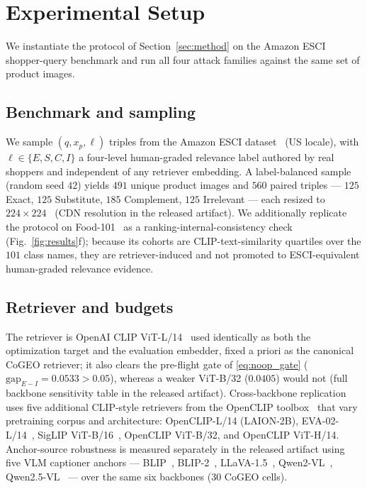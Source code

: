 \section{Experimental Setup}
\label{sec:setup}

We instantiate the protocol of Section~\ref{sec:method} on the Amazon ESCI shopper-query benchmark and run all four attack families against the same set of product images.

\subsection{Benchmark and sampling}
\label{sec:setup:bench}

We sample $(q, x_p, \ell)$ triples from the Amazon ESCI dataset~\cite{reddy2022esci} (US locale), with $\ell \in \{E, S, C, I\}$ a four-level human-graded relevance label authored by real shoppers and independent of any retriever embedding. A label-balanced sample (random seed $42$) yields $491$ unique product images and $560$ paired triples --- $125$ Exact, $125$ Substitute, $185$ Complement, $125$ Irrelevant --- each resized to $224 \times 224$~\cite{radford2021clip} (CDN resolution in the released artifact). We additionally replicate the protocol on Food-101~\cite{bossard2014food101} as a ranking-internal-consistency check (Fig.~\ref{fig:results}f); because its cohorts are CLIP-text-similarity quartiles over the $101$ class names, they are retriever-induced and not promoted to ESCI-equivalent human-graded relevance evidence.

\subsection{Retriever and budgets}
\label{sec:setup:budget}

The retriever is OpenAI CLIP ViT-L/14~\cite{radford2021clip} used identically as both the optimization target and the evaluation embedder, fixed a priori as the canonical CoGEO retriever; it also clears the pre-flight gate of \eqref{eq:noop_gate} ($\mathrm{gap}_{E-I} = 0.0533 > 0.05$), whereas a weaker ViT-B/32 ($0.0405$) would not (full backbone sensitivity table in the released artifact). Cross-backbone replication uses five additional CLIP-style retrievers from the OpenCLIP toolbox~\cite{cherti2023reproducible} that vary pretraining corpus and architecture: OpenCLIP-L/14 (LAION-2B), EVA-02-L/14~\cite{fang2023eva02}, SigLIP ViT-B/16~\cite{zhai2023siglip}, OpenCLIP ViT-B/32, and OpenCLIP ViT-H/14. Anchor-source robustness is measured separately in the released artifact using five VLM captioner anchors --- BLIP~\cite{li2022blip}, BLIP-2~\cite{li2023blip2}, LLaVA-1.5~\cite{liu2024llava}, Qwen2-VL~\cite{wang2024qwen2vl}, Qwen2.5-VL~\cite{bai2024qwen25vl} --- over the same six backbones ($30$ CoGEO cells).

